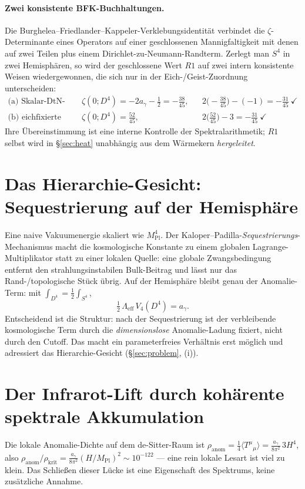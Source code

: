 \documentclass[11pt,a4paper]{article}
\theoremstyle{definition}
\theoremstyle{remark}
\newcommand{\ag}{a_\gamma}
\newcommand{\Mpl}{M_{\mathrm{Pl}}}
\newcommand{\avg}[1]{\langle #1\rangle}
\begin{document}
\paragraph{Zwei konsistente BFK-Buchhaltungen.} Die Burghelea--Friedlander--Kappeler-Verklebungs\-identität
verbindet die $\zeta$-Determinante eines Operators auf einer geschlossenen Mannigfaltigkeit mit denen
auf zwei Teilen plus einem Dirichlet-zu-Neumann-Randterm. Zerlegt man $S^4$ in zwei Hemisphären, so
wird der geschlossene Wert $R1$ auf zwei intern konsistente Weisen wiedergewonnen, die sich nur in
der Eich-/Geist-Zuordnung unterscheiden:
\begin{align}
\text{(a) Skalar-DtN-Aufteilung:}\quad
&\zeta(0;D^4)=-2\ag-\tfrac12=-\tfrac{38}{45},
&&2\bigl(-\tfrac{38}{45}\bigr)-(-1)=-\tfrac{31}{45}\ \checkmark\\
\text{(b) eichfixierte Aufteilung:}\quad
&\zeta(0;D^4)=\tfrac{52}{45},
&&2\bigl(\tfrac{52}{45}\bigr)-3=-\tfrac{31}{45}\ \checkmark
\end{align}
Ihre Übereinstimmung ist eine interne Kontrolle der Spektralarithmetik; $R1$ selbst wird in
\S\ref{sec:heat} unabhängig aus dem Wärmekern \emph{hergeleitet}.

\section{Das Hierarchie-Gesicht: Sequestrierung auf der Hemisphäre}\label{sec:seq}
Eine naive Vakuumenergie skaliert wie $\Mpl^4$. Der Kaloper--Padilla-\emph{Sequestrierungs}-Mechanismus
macht die kosmologische Konstante zu einem globalen Lagrange-Multiplikator statt zu einer lokalen
Quelle: eine globale Zwangsbedingung entfernt den strahlungsinstabilen Bulk-Beitrag und lässt nur
das Rand-/topologische Stück übrig. Auf der Hemisphäre bleibt genau der Anomalie-Term: mit
$\int_{D^4}=\tfrac12\int_{S^4}$,
\begin{equation}\label{eq:sequester}
\tfrac12\,\Lambda_{\mathrm{eff}}\,V_4(D^4)=\ag .
\end{equation}
Entscheidend ist die Struktur: nach der Sequestrierung ist der verbleibende kosmologische Term durch
die \emph{dimensionslose} Anomalie-Ladung fixiert, nicht durch den Cutoff. Das macht ein
parameterfreies Verhältnis erst möglich und adressiert das Hierarchie-Gesicht
(\S\ref{sec:problem}, (i)).

\section{Der Infrarot-Lift durch kohärente spektrale Akkumulation}\label{sec:lift}
Die lokale Anomalie-Dichte auf dem de-Sitter-Raum ist
$\rho_{\mathrm{anom}}=\tfrac14\avg{T^\mu{}_\mu}=\tfrac{\ag}{8\pi^2}\,3H^4$, also
$\rho_{\mathrm{anom}}/\rho_{\mathrm{krit}}=\tfrac{\ag}{8\pi^2}(H/\Mpl)^2\sim10^{-122}$ --- eine rein
lokale Lesart ist viel zu klein. Das Schließen dieser Lücke ist eine Eigenschaft des Spektrums, keine
zusätzliche Annahme.
\end{document}
